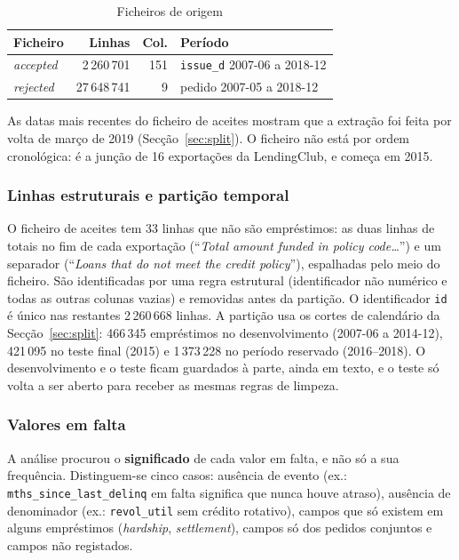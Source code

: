 \begin{table}[!t]
\caption{Ficheiros de origem}
\label{tab:origem}
\centering
\footnotesize
\begin{tabular}{|l|r|r|l|}
\hline
\textbf{Ficheiro} & \textbf{Linhas} & \textbf{Col.} & \textbf{Período} \\
\hline
\textit{accepted} & 2\,260\,701 & 151 & \texttt{issue\_d} 2007-06 a 2018-12 \\
\hline
\textit{rejected} & 27\,648\,741 & 9 & pedido 2007-05 a 2018-12 \\
\hline
\end{tabular}
\end{table}

As datas mais recentes do ficheiro de aceites mostram que a extração foi feita por volta
de março de 2019 (Secção~\ref{sec:split}). O ficheiro não está por ordem cronológica: é a
junção de 16 exportações da LendingClub, e começa em 2015.

\subsubsection{Linhas estruturais e partição temporal}

O ficheiro de aceites tem 33 linhas que não são empréstimos: as duas linhas de totais no
fim de cada exportação (``\textit{Total amount funded in policy code\ldots}'') e um
separador (``\textit{Loans that do not meet the credit policy}''), espalhadas pelo meio do
ficheiro. São identificadas por uma regra estrutural (identificador não numérico e todas
as outras colunas vazias) e removidas antes da partição. O identificador \texttt{id} é
único nas restantes 2\,260\,668 linhas. A partição usa os cortes de calendário da
Secção~\ref{sec:split}: 466\,345 empréstimos no desenvolvimento (2007-06 a 2014-12),
421\,095 no teste final (2015) e 1\,373\,228 no período reservado (2016--2018). O
desenvolvimento e o teste ficam guardados à parte, ainda em texto, e o teste só volta a
ser aberto para receber as mesmas regras de limpeza.

\subsubsection{Valores em falta}

A análise procurou o \textbf{significado} de cada valor em falta, e não só a sua
frequência. Distinguem-se cinco casos: ausência de evento (ex.:
\texttt{mths\_since\_last\_delinq} em falta significa que nunca houve atraso), ausência de
denominador (ex.: \texttt{revol\_util} sem crédito rotativo), campos que só existem em
alguns empréstimos (\textit{hardship}, \textit{settlement}), campos só dos pedidos
conjuntos e campos não registados.

